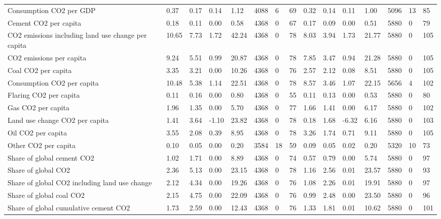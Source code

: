 \begin{longtable}{lllllllllllllll}
\addlinespace
Consumption CO2 per GDP & 0.37 & 0.17 & 0.14 & 1.12 & 4088 & 6 & 69 & 0.32 & 0.14 & 0.11 & 1.00 & 5096 & 13 & 85\\
Cement CO2 per capita & 0.18 & 0.11 & 0.00 & 0.58 & 4368 & 0 & 67 & 0.17 & 0.09 & 0.00 & 0.51 & 5880 & 0 & 79\\
CO2 emissions including land use change per capita & 10.65 & 7.73 & 1.72 & 42.24 & 4368 & 0 & 78 & 8.03 & 3.94 & 1.73 & 21.77 & 5880 & 0 & 105\\
CO2 emissions per capita & 9.24 & 5.51 & 0.99 & 20.87 & 4368 & 0 & 78 & 7.85 & 3.47 & 0.94 & 21.28 & 5880 & 0 & 105\\
Coal CO2 per capita & 3.35 & 3.21 & 0.00 & 10.26 & 4368 & 0 & 76 & 2.57 & 2.12 & 0.08 & 8.51 & 5880 & 0 & 105\\
\addlinespace
Consumption CO2 per capita & 10.48 & 5.38 & 1.14 & 22.51 & 4368 & 0 & 78 & 8.57 & 3.46 & 1.07 & 22.15 & 5656 & 4 & 102\\
Flaring CO2 per capita & 0.11 & 0.16 & 0.00 & 0.80 & 4368 & 0 & 55 & 0.11 & 0.13 & 0.00 & 0.53 & 5880 & 0 & 80\\
Gas CO2 per capita & 1.96 & 1.35 & 0.00 & 5.70 & 4368 & 0 & 77 & 1.66 & 1.41 & 0.00 & 6.17 & 5880 & 0 & 102\\
Land use change CO2 per capita & 1.41 & 3.64 & -1.10 & 23.82 & 4368 & 0 & 78 & 0.18 & 1.68 & -6.32 & 6.16 & 5880 & 0 & 103\\
Oil CO2 per capita & 3.55 & 2.08 & 0.39 & 8.95 & 4368 & 0 & 78 & 3.26 & 1.74 & 0.71 & 9.11 & 5880 & 0 & 105\\
\addlinespace
Other CO2 per capita & 0.10 & 0.05 & 0.00 & 0.20 & 3584 & 18 & 59 & 0.09 & 0.05 & 0.02 & 0.20 & 5320 & 10 & 73\\
Share of global cement CO2 & 1.02 & 1.71 & 0.00 & 8.89 & 4368 & 0 & 74 & 0.57 & 0.79 & 0.00 & 5.74 & 5880 & 0 & 97\\
Share of global CO2 & 2.36 & 5.13 & 0.00 & 23.15 & 4368 & 0 & 78 & 1.16 & 2.56 & 0.01 & 23.57 & 5880 & 0 & 93\\
Share of global CO2 including land use change & 2.12 & 4.34 & 0.00 & 19.26 & 4368 & 0 & 76 & 1.08 & 2.26 & 0.01 & 19.91 & 5880 & 0 & 97\\
Share of global coal CO2 & 2.15 & 4.75 & 0.00 & 22.09 & 4368 & 0 & 76 & 0.99 & 2.48 & 0.00 & 23.50 & 5880 & 0 & 96\\
\addlinespace
Share of global cumulative cement CO2 & 1.73 & 2.59 & 0.00 & 12.43 & 4368 & 0 & 76 & 1.33 & 1.81 & 0.01 & 10.62 & 5880 & 0 & 101\\

\end{longtable}
